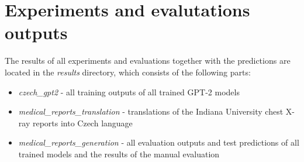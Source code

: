 \documentclass[12pt,a4paper]{report}
\let\openright=\clearpage
\begin{document}
\section{Experiments and evalutations outputs}
\label{add:Outputs}
The results of all experiments and evaluations together with the predictions are located in the \textit{results} directory, which consists of the following parts:
\begin{itemize}
	\item \textit{czech\_gpt2} - all training outputs of all trained GPT-2 models
	\item \textit{medical\_reports\_translation} - translations of the Indiana University chest X-ray reports into Czech language
	\item \textit{medical\_reports\_generation} - all evaluation outputs and test predictions of all trained models and the results of the manual evaluation
\end{itemize}

\openright
\end{document}

